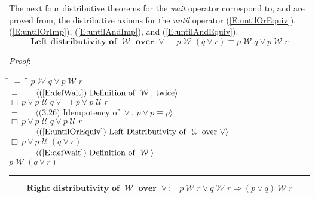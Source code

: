 \documentclass[12pt, fleqn, leqno]{article}
\newcommand{\lgap}{2pt}                             %
\newcommand{\mymathindent}{24pt}                    %
\newcommand{\impl}{\ensuremath{\Rightarrow}}        %
\newcommand{\Until}{\;\mathcal{U}\;}
\newcommand{\Wait}{\;\mathcal{W}\;}
\newcommand{\Always}{\Box\,}
\newcommand{\myqed}{\rule[-.23ex]{1.2ex}{2.0ex}}
\newcommand{\myqedtab}{\hspace{384pt}}              %
\newcommand{\Gll} {\langle}                         %
\newcommand{\Ggg} {\rangle}                         %
\newcommand{\Hint}[1]     {\ \ \ $\Gll              \mbox{#1} \Ggg$ }   %
\begin{document}
The next four distributive theorems for the \textit{wait} operator correspond to, and are proved from,
the distributive axioms for the \textit{until} operator
(\ref{E:untilOrEquiv}), (\ref{E:untilOrImp}), (\ref{E:untilAndImp}), and (\ref{E:untilAndEquiv}).
\begin{equation}\label{E:waitOrDist}
\textbf{Left distributivity of $\Wait$ over $\lor$:}\quad p \Wait (q \lor r) \equiv p \Wait q \lor p \Wait r
\end{equation}

\emph{Proof}:
\begin{tabbing}
\hspace{\mymathindent} \= $= \;$ \= \myqedtab \= \kill
\> \> $p \Wait q \lor p \Wait r$\\[\lgap]
\> $=$ \> \Hint{(\ref{E:defWait}) Definition of $\Wait$, twice} \\[\lgap]
\> \> $\Always p\lor p \Until q \lor \Always p\lor p \Until r$\\[\lgap]
\> $=$ \> \Hint{(3.26) Idempotency of $\lor$, $p \lor p \equiv p$} \\[\lgap]
\> \> $\Always p\lor p \Until q \lor p \Until r$\\[\lgap]
\> $=$ \> \Hint{(\ref{E:untilOrEquiv}) Left Distributivity of $\Until$ over $\lor$} \\[\lgap]
\> \> $\Always p\lor p \Until (q \lor r)$\\[\lgap]
\> $=$ \> \Hint{(\ref{E:defWait}) Definition of $\Wait$} \\[\lgap]
\> \> $p \Wait (q \lor r)$ \quad \myqed
\end{tabbing}
\begin{equation}\label{E:rightWaitOrDist}
\textbf{Right distributivity of $\Wait$ over $\lor$:}\quad p \Wait r \lor q \Wait r \impl (p \lor q) \Wait r
\end{equation}
\end{document}
